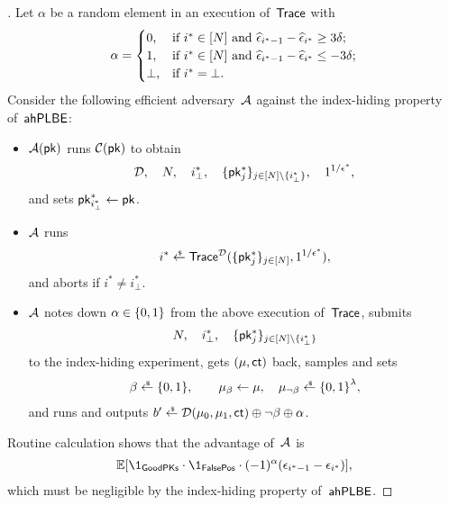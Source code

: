 \begin{proof}[]
Let $\alpha$ be a random element in an execution of~$\Trace$ with
\begin{align*}
\alpha=\begin{cases}
0,&\textup{if }i^\ast\in[N]\textup{ and }
\widehat{\epsilon}_{i^\ast-1}-\widehat{\epsilon}_{i^\ast}\geq 3\delta;\\
1,&\textup{if }i^\ast\in[N]\textup{ and }
\widehat{\epsilon}_{i^\ast-1}-\widehat{\epsilon}_{i^\ast}\leq -3\delta;\\
\bot,&\textup{if }i^\ast=\bot.
\end{cases}
\end{align*}
Consider the following efficient adversary~${\mathcal{A}}$ against the index-hiding property of~$\AHPLBE$:
\begin{itemize}
\item $\scriptA(\pk)$ runs $\scriptC(\pk)$ to obtain
\begin{align*}
\scriptD,\quad
N,\quad
i_\bot^\ast,\quad
\{\pk^\ast_j\}_{j\in{[N]\setminus{\{i_\bot^\ast\}}}},\quad
1^{1/\epsilon^\ast},
\end{align*}
and sets ${\pk^\ast_{i_\bot^\ast}\gets\pk}$.
\item ${\mathcal{A}}$ runs
\begin{align*}
i^\ast\draws\Trace^\scriptD(\{\pk^\ast_j\}_{j\in[N]},1^{1/\epsilon^\ast}),
\end{align*}
and aborts if ${i^\ast\neq i_\bot^\ast}$.
\item ${\mathcal{A}}$ notes down ${\alpha\in{\{0,1\}}}$ from the above execution of~$\Trace$,
submits
\begin{align*}
N,\quad
i_\bot^\ast,\quad
\{\pk^\ast_j\}_{j\in[N]\setminus\{i_\bot^\ast\}}
\end{align*}
to the index-hiding experiment,
gets $(\mu,\ct)$ back,
samples and sets
\begin{align*}
\beta\draws\bit,\qquad
\mu_\beta\gets\mu,\quad
\mu_{\neg\beta}\draws\bit^\lambda,
\end{align*}
and runs and outputs
${b'\draws\scriptD(\mu_0,\mu_1,\ct)\oplus\neg\beta\oplus\alpha}$.
\end{itemize}
Routine calculation shows that the advantage of~${\mathcal{A}}$ is
\begin{align*}
\E[\1_\GoodPKs\cdot\1_\FalsePos\cdot(-1)^\alpha(\epsilon_{i^\ast-1}-\epsilon_{i^\ast})],
\end{align*}
which must be negligible by the index-hiding property of~$\AHPLBE$.


\end{proof}
